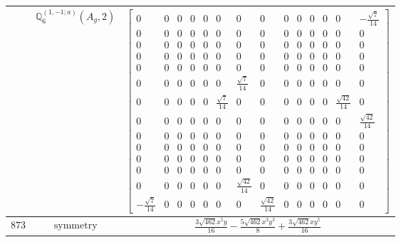 \documentclass[fleqn,8pt,landscape]{jsarticle}
\begin{document}
\begin{longtable}{ccc}
$  $ & $ \mathbb{Q}_{6}^{(1,-1;a)}(A_{g},2) $ & $ \begin{bmatrix} 0 & 0 & 0 & 0 & 0 & 0 & 0 & 0 & 0 & 0 & 0 & 0 & 0 & - \frac{\sqrt{7}}{14} \\ 0 & 0 & 0 & 0 & 0 & 0 & 0 & 0 & 0 & 0 & 0 & 0 & 0 & 0 \\ 0 & 0 & 0 & 0 & 0 & 0 & 0 & 0 & 0 & 0 & 0 & 0 & 0 & 0 \\ 0 & 0 & 0 & 0 & 0 & 0 & 0 & 0 & 0 & 0 & 0 & 0 & 0 & 0 \\ 0 & 0 & 0 & 0 & 0 & 0 & 0 & 0 & 0 & 0 & 0 & 0 & 0 & 0 \\ 0 & 0 & 0 & 0 & 0 & 0 & \frac{\sqrt{7}}{14} & 0 & 0 & 0 & 0 & 0 & 0 & 0 \\ 0 & 0 & 0 & 0 & 0 & \frac{\sqrt{7}}{14} & 0 & 0 & 0 & 0 & 0 & 0 & \frac{\sqrt{42}}{14} & 0 \\ 0 & 0 & 0 & 0 & 0 & 0 & 0 & 0 & 0 & 0 & 0 & 0 & 0 & \frac{\sqrt{42}}{14} \\ 0 & 0 & 0 & 0 & 0 & 0 & 0 & 0 & 0 & 0 & 0 & 0 & 0 & 0 \\ 0 & 0 & 0 & 0 & 0 & 0 & 0 & 0 & 0 & 0 & 0 & 0 & 0 & 0 \\ 0 & 0 & 0 & 0 & 0 & 0 & 0 & 0 & 0 & 0 & 0 & 0 & 0 & 0 \\ 0 & 0 & 0 & 0 & 0 & 0 & 0 & 0 & 0 & 0 & 0 & 0 & 0 & 0 \\ 0 & 0 & 0 & 0 & 0 & 0 & \frac{\sqrt{42}}{14} & 0 & 0 & 0 & 0 & 0 & 0 & 0 \\ - \frac{\sqrt{7}}{14} & 0 & 0 & 0 & 0 & 0 & 0 & \frac{\sqrt{42}}{14} & 0 & 0 & 0 & 0 & 0 & 0 \end{bmatrix} $ \\ \hline
$ 873 $ & $ \text{symmetry} $ & $ \frac{3 \sqrt{462} x^{5} y}{16} - \frac{5 \sqrt{462} x^{3} y^{3}}{8} + \frac{3 \sqrt{462} x y^{5}}{16} $ \\

\end{longtable}
\end{document}
